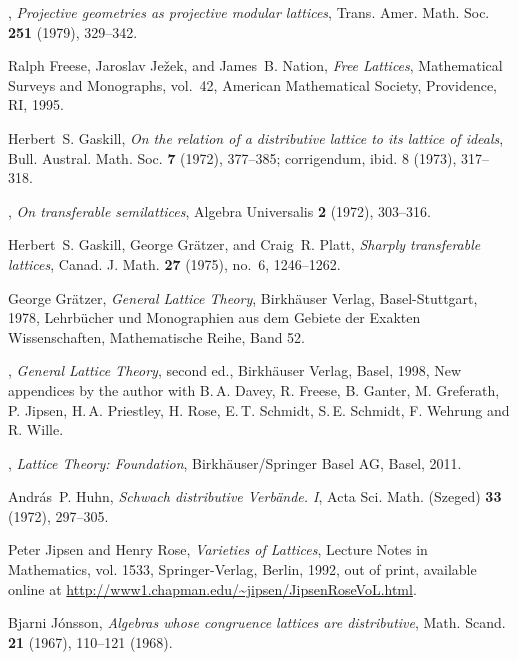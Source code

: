 \documentclass[reqno]{amsart}
\numberwithin{equation}{section}
\theoremstyle{plain}
\theoremstyle{definition}
\theoremstyle{remark}
\numberwithin{figure}{section}
\numberwithin{table}{section}
\begin{document}
\begin{thebibliography}{10}
\bysame, \emph{Projective geometries as projective modular lattices}, Trans.
  Amer. Math. Soc. \textbf{251} (1979), 329--342. 

Ralph Freese, Jaroslav Je{\v{z}}ek, and James~B. Nation, \emph{Free
  {L}attices}, Mathematical Surveys and Monographs, vol.~42, American
  Mathematical Society, Providence, RI, 1995. 

Herbert~S. Gaskill, \emph{On the relation of a distributive lattice to its
  lattice of ideals}, Bull. Austral. Math. Soc. \textbf{7} (1972), 377--385;
  corrigendum, ibid. 8 (1973), 317--318. 

\bysame, \emph{On transferable semilattices}, Algebra Universalis \textbf{2}
  (1972), 303--316. 

Herbert~S. Gaskill, George Gr{\"a}tzer, and Craig~R. Platt, \emph{Sharply
  transferable lattices}, Canad. J. Math. \textbf{27} (1975), no.~6,
  1246--1262. 

George Gr{\"a}tzer, \emph{General {L}attice {T}heory}, Birkh\"auser Verlag,
  Basel-Stuttgart, 1978, Lehrb{\"u}cher und Monographien aus dem Gebiete der
  Exakten Wissenschaften, Mathematische Reihe, Band 52. 

\bysame, \emph{General {L}attice {T}heory}, second ed., Birkh\"auser {V}erlag,
  Basel, 1998, New appendices by the author with {B.\,A.} Davey, R. Freese, B.
  Ganter, M. Greferath, P. Jipsen, {H.\,A.} Priestley, H. Rose, {E.\,T.}
  Schmidt, {S.\,E.} Schmidt, F. Wehrung and R. Wille. 

\bysame, \emph{{Lattice Theory: Foundation}}, Birkh\"auser/Springer Basel AG,
  Basel, 2011. 

Andr{\'a}s~P. Huhn, \emph{Schwach distributive {V}erb\"ande. {I}}, Acta Sci.
  Math. (Szeged) \textbf{33} (1972), 297--305. 

Peter Jipsen and Henry Rose, \emph{{Varieties of Lattices}}, Lecture Notes in
  Mathematics, vol. 1533, Springer-Verlag, Berlin, 1992, out of print,
  available online at \url{http://www1.chapman.edu/~jipsen/JipsenRoseVoL.html}.

Bjarni J{\'o}nsson, \emph{Algebras whose congruence lattices are distributive},
  Math. Scand. \textbf{21} (1967), 110--121 (1968). 


\end{thebibliography}
\end{document}
